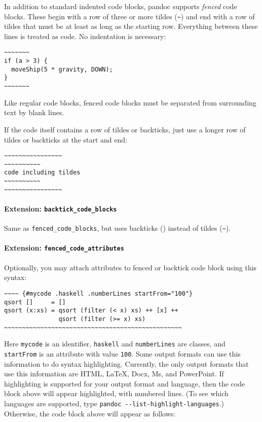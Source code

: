 \documentclass[
  a4paper,
]{article}
\begin{document}
In addition to standard indented code blocks, pandoc supports
\emph{fenced} code blocks. These begin with a row of three or more
tildes (\texttt{\textasciitilde{}}) and end with a row of tildes that
must be at least as long as the starting row. Everything between these
lines is treated as code. No indentation is necessary:

\begin{verbatim}
~~~~~~~
if (a > 3) {
  moveShip(5 * gravity, DOWN);
}
~~~~~~~
\end{verbatim}

Like regular code blocks, fenced code blocks must be separated from
surrounding text by blank lines.

If the code itself contains a row of tildes or backticks, just use a
longer row of tildes or backticks at the start and end:

\begin{verbatim}
~~~~~~~~~~~~~~~~
~~~~~~~~~~
code including tildes
~~~~~~~~~~
~~~~~~~~~~~~~~~~
\end{verbatim}

\hypertarget{extension-backtick_code_blocks}{%
\paragraph{\texorpdfstring{Extension:
\texttt{backtick\_code\_blocks}}{Extension: backtick\_code\_blocks}}\label{extension-backtick_code_blocks}}

Same as \texttt{fenced\_code\_blocks}, but uses backticks
(\texttt{\textasciigrave{}}) instead of tildes
(\texttt{\textasciitilde{}}).

\hypertarget{extension-fenced_code_attributes}{%
\paragraph{\texorpdfstring{Extension:
\texttt{fenced\_code\_attributes}}{Extension: fenced\_code\_attributes}}\label{extension-fenced_code_attributes}}

Optionally, you may attach attributes to fenced or backtick code block
using this syntax:

\begin{verbatim}
~~~~ {#mycode .haskell .numberLines startFrom="100"}
qsort []     = []
qsort (x:xs) = qsort (filter (< x) xs) ++ [x] ++
               qsort (filter (>= x) xs)
~~~~~~~~~~~~~~~~~~~~~~~~~~~~~~~~~~~~~~~~~~~~~~~~~
\end{verbatim}

Here \texttt{mycode} is an identifier, \texttt{haskell} and
\texttt{numberLines} are classes, and \texttt{startFrom} is an attribute
with value \texttt{100}. Some output formats can use this information to
do syntax highlighting. Currently, the only output formats that use this
information are HTML, LaTeX, Docx, Ms, and PowerPoint. If highlighting
is supported for your output format and language, then the code block
above will appear highlighted, with numbered lines. (To see which
languages are supported, type
\texttt{pandoc\ -\/-list-highlight-languages}.) Otherwise, the code
block above will appear as follows:
\end{document}
